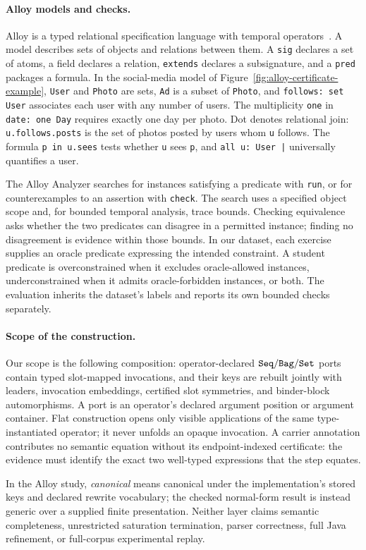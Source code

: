 \paragraph{Alloy models and checks.}
Alloy is a typed relational specification language with temporal
operators~\cite{alloy,kodkod}. A model describes sets of objects and relations
between them. A \texttt{sig} declares a set of atoms, a field declares a
relation, \texttt{extends} declares a subsignature, and a \texttt{pred}
packages a formula. In the social-media model of
Figure~\ref{fig:alloy-certificate-example}, \texttt{User} and \texttt{Photo}
are sets, \texttt{Ad} is a subset of \texttt{Photo}, and
\texttt{follows: set User} associates each user with any number of users.
The multiplicity \texttt{one} in \texttt{date: one Day} requires exactly
one day per photo. Dot denotes relational join:
\texttt{u.follows.posts} is the set of photos posted by users whom
\texttt{u} follows. The formula \texttt{p in u.sees} tests whether
\texttt{u} sees \texttt{p}, and \texttt{all u: User |} universally
quantifies a user.

The Alloy Analyzer searches for instances satisfying a predicate with
\texttt{run}, or for counterexamples to an assertion with \texttt{check}.
The search uses a specified object scope and, for bounded temporal analysis,
trace bounds. Checking equivalence asks whether the two predicates can
disagree in a permitted instance; finding no disagreement is evidence within
those bounds. In our dataset, each exercise supplies an oracle predicate
expressing the intended constraint. A student predicate is overconstrained
when it excludes oracle-allowed instances, underconstrained when it admits
oracle-forbidden instances, or both. The evaluation inherits the dataset's
labels and reports its own bounded checks separately.

\paragraph{Scope of the construction.}
Our scope is the following composition: operator-declared
$\texttt{Seq}/\texttt{Bag}/\texttt{Set}$ ports contain typed slot-mapped invocations, and their keys
are rebuilt jointly with leaders, invocation embeddings, certified slot
symmetries, and binder-block automorphisms. A port is an operator's declared
argument position or argument container. Flat construction opens only
visible applications of the same type-instantiated operator; it never unfolds
an opaque invocation. A carrier annotation contributes no semantic equation
without its endpoint-indexed certificate: the evidence must identify the
exact two well-typed expressions that the step equates.

In the Alloy study, \emph{canonical} means canonical under the implementation's
stored keys and declared rewrite vocabulary; the checked normal-form result
is instead generic over a supplied finite presentation. Neither layer claims
semantic completeness, unrestricted saturation termination, parser
correctness, full Java refinement, or full-corpus experimental replay.
